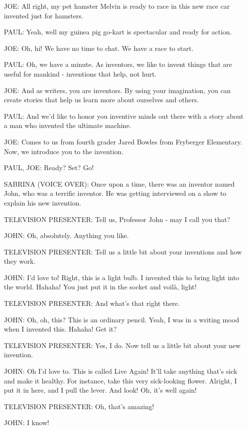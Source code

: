 JOE:
All right, my pet hamster Melvin is ready to race in this new race car invented just for hamsters.

PAUL:
Yeah, well my guinea pig go-kart is spectacular and ready for action.

JOE:
Oh, hi!
We have no time to chat.
We have a race to start.

PAUL:
Oh, we have a minute.
As inventors, we like to invent things that are useful for mankind - inventions that help, not hurt.

JOE:
And as writers, you are inventors.
By using your imagination, you can create stories that help us learn more about ourselves and others.

PAUL:
And we'd like to honor you inventive minds out there with a story about a man who invented the ultimate machine.

JOE:
Comes to us from fourth grader Jared Bowles from Fryberger Elementary.
Now, we introduce you to the invention.

PAUL, JOE:
Ready? Set? Go!

SABRINA (VOICE OVER):
Once upon a time, there was an inventor named John, who was a terrific inventor.
He was getting interviewed on a show to explain his new invention.

TELEVISION PRESENTER:
Tell us, Professor John - may I call you that?

JOHN:
Oh, absolutely.
Anything you like.

TELEVISION PRESENTER:
Tell us a little bit about your inventions and how they work.

JOHN:
I'd love to!
Right, this is a light bulb.
I invented this to bring light into the world.
Hahaha!
You just put it in the socket and voilà, light!

TELEVISION PRESENTER:
And what's that right there.

JOHN:
Oh, oh, this?
This is an ordinary pencil.
Yeah, I was in a writing mood when I invented this.
Hahaha!
Get it?

TELEVISION PRESENTER:
Yes, I do.
Now tell us a little bit about your new invention.

JOHN:
Oh I'd love to.
This is called Live Again!
It'll take anything that's sick and make it healthy.
For instance, take this very sick-looking flower.
Alright, I put it in here, and I pull the lever.
And look!
Oh, it's well again!

TELEVISION PRESENTER:
Oh, that's amazing!

JOHN:
I know!

